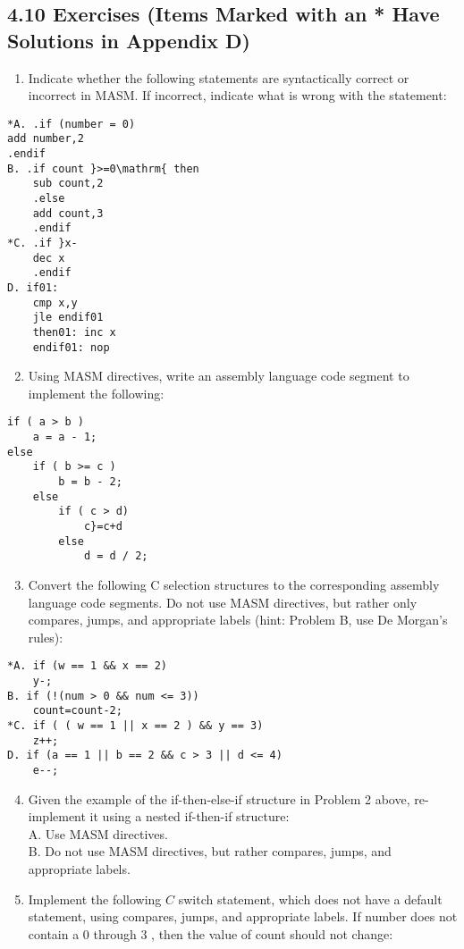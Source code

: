 \documentclass[10pt]{article}
\begin{document}
\subsection*{4.10 Exercises (Items Marked with an * Have Solutions in Appendix D)}
\begin{enumerate}
  \item Indicate whether the following statements are syntactically correct or incorrect in MASM. If incorrect, indicate what is wrong with the statement:
\end{enumerate}

\begin{verbatim}
*A. .if (number = 0)
add number,2
.endif
B. .if count }>=0\mathrm{ then
    sub count,2
    .else
    add count,3
    .endif
*C. .if }x-
    dec x
    .endif
D. if01:
    cmp x,y
    jle endif01
    then01: inc x
    endif01: nop
\end{verbatim}

\begin{enumerate}
  \setcounter{enumi}{1}
  \item Using MASM directives, write an assembly language code segment to implement the following:
\end{enumerate}

\begin{verbatim}
if ( a > b )
    a = a - 1;
else
    if ( b >= c )
        b = b - 2;
    else
        if ( c > d)
            c}=c+d
        else
            d = d / 2;
\end{verbatim}

\begin{enumerate}
  \setcounter{enumi}{2}
  \item Convert the following C selection structures to the corresponding assembly language code segments. Do not use MASM directives, but rather only compares, jumps, and appropriate labels (hint: Problem B, use De Morgan's rules):
\end{enumerate}

\begin{verbatim}
*A. if (w == 1 && x == 2)
    y-;
B. if (!(num > 0 && num <= 3))
    count=count-2;
*C. if ( ( w == 1 || x == 2 ) && y == 3)
    z++;
D. if (a == 1 || b == 2 && c > 3 || d <= 4)
    e--;
\end{verbatim}

\begin{enumerate}
  \setcounter{enumi}{3}
  \item Given the example of the if-then-else-if structure in Problem 2 above, re-implement it using a nested if-then-if structure:\\
A. Use MASM directives.\\
B. Do not use MASM directives, but rather compares, jumps, and appropriate labels.
  \item Implement the following $C$ switch statement, which does not have a default statement, using compares, jumps, and appropriate labels. If number does not contain a 0 through 3 , then the value of count should not change:
\end{enumerate}
\end{document}
